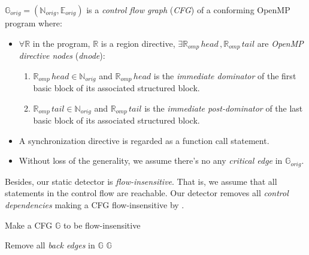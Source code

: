 $\mathbb{G}_{orig} = (\mathbb{N}_{orig}, \mathbb{E}_{orig})$ is a \textit{control flow graph} (\textit{CFG}) of a conforming OpenMP program where:
\begin{itemize}
	\item $\forall\mathbb{R}$ in the program, $\mathbb{R}$ is a region directive, $\exists \mathbb{R}_{omp}\, head\,,\mathbb{R}_{omp}\, tail$ are \textit{OpenMP directive nodes} (\textit{dnode}):
		\begin{enumerate}
			\item $\mathbb{R}_{omp}\, head \in \mathbb{N}_{orig}$ and $\mathbb{R}_{omp}\, head$ is the \textit{immediate dominator} of the first basic block of its associated structured block.
			\item $\mathbb{R}_{omp}\, tail \in \mathbb{N}_{orig}$ and $\mathbb{R}_{omp}\, tail$ is the \textit{immediate post-dominator} of the last basic block of its associated structured block.
		\end{enumerate}
	\item A synchronization directive is regarded as a function call statement.
	\item Without loss of the generality, we assume there's no any \textit{critical edge} in $\mathbb{G}_{orig}$.
\end{itemize} 

Besides, our static detector is \textit{flow-insensitive}. That is, we assume that all statements in the control flow are reachable. Our detector removes all \textit{control dependencies} making a CFG flow-insensitive by .
\begin{algorithm}
	\caption{Make a CFG $\mathbb{G}$ to be flow-insensitive}\label{a:flow-insensitive-pseudocode}
	\begin{algorithmic}[1]
			\State {}
			\State Remove all \textit{back edges} in $\mathbb{G}$
					\State {}
							\State {}
							\State {}
						\EndFor
					\EndIf
						\State {}
					\EndIf
				\EndFor
				\State {}
			\EndWhile
			\State \Return $\mathbb{G}$
		\EndProcedure
	\end{algorithmic}
\end{algorithm}


